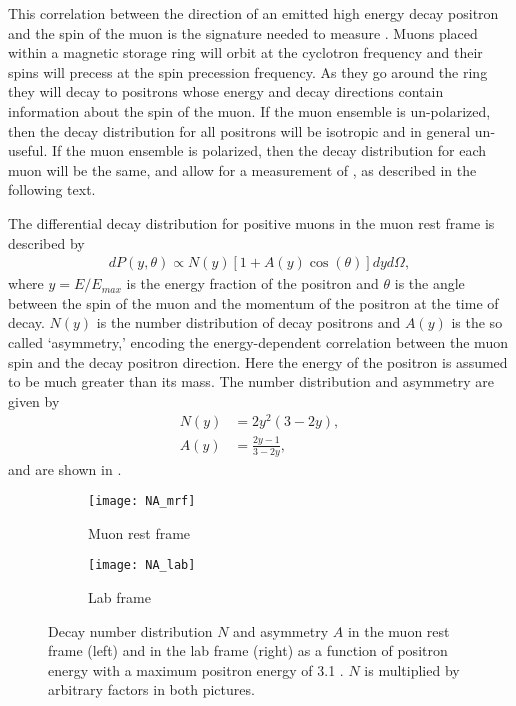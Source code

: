 This correlation between the direction of an emitted high energy decay positron and the spin of the muon is the signature needed to measure \wa. Muons placed within a magnetic storage ring will orbit at the cyclotron frequency and their spins will precess at the spin precession frequency. As they go around the ring they will decay to positrons whose energy and decay directions contain information about the spin of the muon. If the muon ensemble is un-polarized, then the decay distribution for all positrons will be isotropic and in general un-useful. If the muon ensemble is polarized, then the decay distribution for each muon will be the same, and allow for a measurement of \wa, as described in the following text.


The differential decay distribution for positive muons in the muon rest frame is described by \cite{Bucksbaum}
        \begin{align} \label{eq:diffdecaydist}
            dP(y, \theta) \propto N(y)[1 + A(y)\cos(\theta)]dy d\Omega,
        \end{align}
where $y=E/E_{max}$ is the energy fraction of the positron and $\theta$ is the angle between the spin of the muon and the momentum of the positron at the time of decay. $N(y)$ is the number distribution of decay positrons and $A(y)$ is the so called `asymmetry,' encoding the energy-dependent correlation between the muon spin and the decay positron direction. Here the energy of the positron is assumed to be much greater than its mass. The number distribution and asymmetry are given by \cite{Bucksbaum}
        \begin{align}
            N(y) &= 2y^{2}(3-2y), \label{eq:Nmrf} \\
            A(y) &= \frac{2y-1}{3-2y}, \label{eq:Amrf}
        \end{align}
and are shown in . 

\begin{figure}[]
\centering
    \begin{subfigure}[]{0.45\textwidth}
        \centering
        \texttt{[image: NA\_mrf]}
        \caption{Muon rest frame}
    \label{fig:NA2mrf}
    \end{subfigure}%
    \hspace{1cm}
    \begin{subfigure}[]{0.45\textwidth}
        \centering
        \texttt{[image: NA\_lab]}
        \caption{Lab frame}
    \label{fig:NA2lab}    
    \end{subfigure}
\caption[Number distribution and asymmetry for muon decay in the muon rest frame and lab frame]{Decay number distribution $N$ and asymmetry $A$ in the muon rest frame (left) and in the lab frame (right) as a function of positron energy with a maximum positron energy of 3.1 \GeV. $N$ is multiplied by arbitrary factors in both pictures.}
\label{fig:NA2}
\end{figure}

